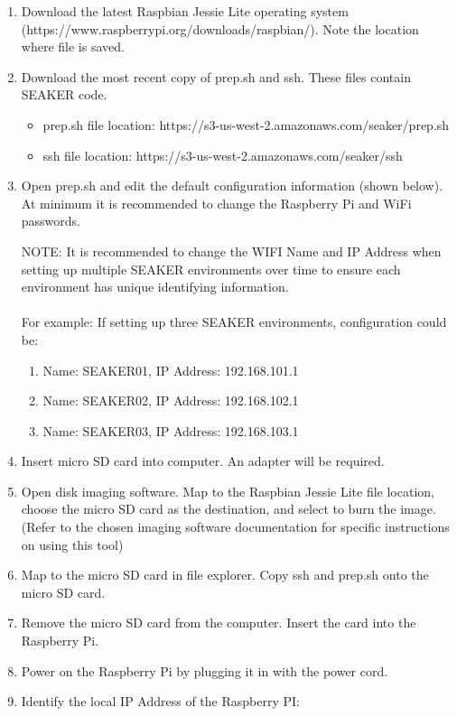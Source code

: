 \documentclass[12pt]{article}
\begin{document}
\begin{enumerate}
  \item Download the latest Raspbian Jessie Lite operating system\\
  (https://www.raspberrypi.org/downloads/raspbian/).
  Note the location where file is saved.
  \item Download the most recent copy of prep.sh and ssh. These files
  contain SEAKER code.
    \begin{itemize}
      \item prep.sh file location: https://s3-us-west-2.amazonaws.com/seaker/prep.sh
      \item ssh file location: https://s3-us-west-2.amazonaws.com/seaker/ssh
    \end{itemize}
  \item Open prep.sh and edit the default configuration information
  (shown below). At minimum it is recommended to change the Raspberry
  Pi and WiFi passwords.
  
  NOTE: It is recommended to change the WIFI Name and IP Address when
  setting up multiple SEAKER environments over time to ensure each
  environment has unique identifying information.\\
  \\
  For example: If setting up three SEAKER environments, configuration could be:
    \begin{enumerate}
      \item Name: SEAKER01, IP Address: 192.168.101.1
      \item Name: SEAKER02, IP Address: 192.168.102.1
      \item Name: SEAKER03, IP Address: 192.168.103.1
    \end{enumerate}
  \item Insert micro SD card into computer. An adapter will be required.
  \item Open disk imaging software. Map to the Raspbian Jessie Lite file
  location, choose the micro SD card as the destination, and select to burn
  the image. (Refer to the chosen imaging software documentation for
  specific instructions on using this tool)
  \item Map to the micro SD card in file explorer. Copy ssh and prep.sh
  onto the micro SD card.
  \item Remove the micro SD card from the computer. Insert the card into
  the Raspberry Pi.
  \item Power on the Raspberry Pi by plugging it in with the power cord.
  \item Identify the local IP Address of the Raspberry PI:\\

\end{enumerate}
\end{document}
